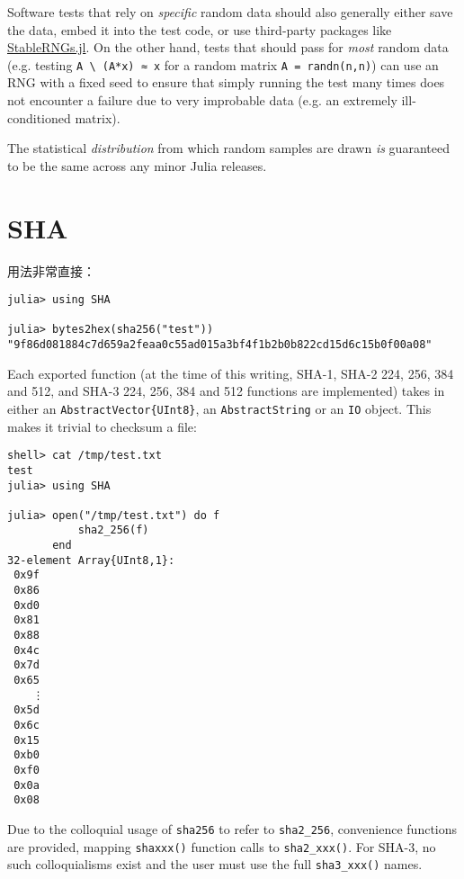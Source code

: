 Software tests that rely on \emph{specific} {\textquotedbl}random{\textquotedbl} data should also generally either save the data, embed it into the test code, or use third-party packages like \href{https://github.com/JuliaRandom/StableRNGs.jl}{StableRNGs.jl}. On the other hand, tests that should pass for \emph{most} random data (e.g. testing \texttt{A {\textbackslash} (A*x) ≈ x} for a random matrix \texttt{A = randn(n,n)}) can use an RNG with a fixed seed to ensure that simply running the test many times does not encounter a failure due to very improbable data (e.g. an extremely ill-conditioned matrix).



The statistical \emph{distribution} from which random samples are drawn \emph{is} guaranteed to be the same across any minor Julia releases.



\hypertarget{15457917914318839048}{}


\chapter{SHA}



用法非常直接：




\begin{verbatim}
julia> using SHA

julia> bytes2hex(sha256("test"))
"9f86d081884c7d659a2feaa0c55ad015a3bf4f1b2b0b822cd15d6c15b0f00a08"
\end{verbatim}



Each exported function (at the time of this writing, SHA-1, SHA-2 224, 256, 384 and 512, and SHA-3 224, 256, 384 and 512 functions are implemented) takes in either an \texttt{AbstractVector\{UInt8\}}, an \texttt{AbstractString} or an \texttt{IO} object.  This makes it trivial to checksum a file:




\begin{verbatim}
shell> cat /tmp/test.txt
test
julia> using SHA

julia> open("/tmp/test.txt") do f
           sha2_256(f)
       end
32-element Array{UInt8,1}:
 0x9f
 0x86
 0xd0
 0x81
 0x88
 0x4c
 0x7d
 0x65
    ⋮
 0x5d
 0x6c
 0x15
 0xb0
 0xf0
 0x0a
 0x08
\end{verbatim}



Due to the colloquial usage of \texttt{sha256} to refer to \texttt{sha2\_256}, convenience functions are provided, mapping \texttt{shaxxx()} function calls to \texttt{sha2\_xxx()}.  For SHA-3, no such colloquialisms exist and the user must use the full \texttt{sha3\_xxx()} names.



